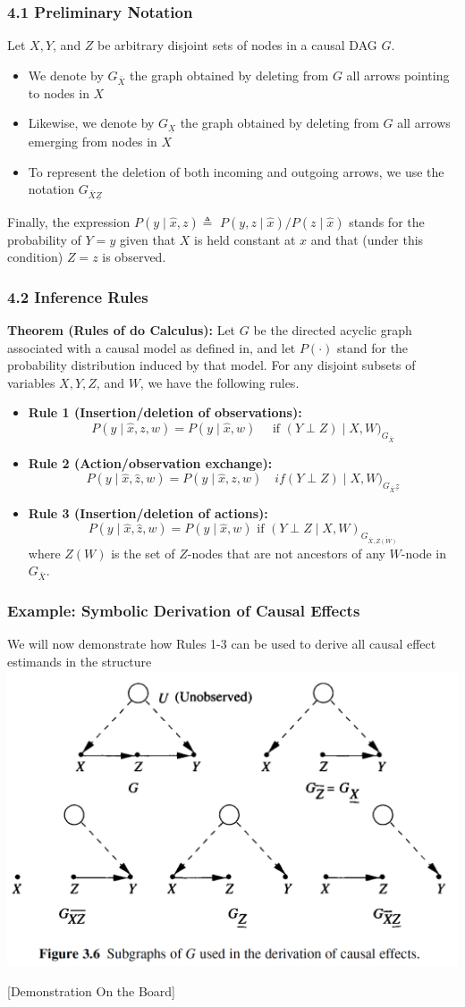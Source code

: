 \documentclass{beamer}
\begin{document}
\begin{frame}
\frametitle{4.1 Preliminary Notation}
Let $X, Y$, and $Z$ be arbitrary disjoint sets of nodes in a causal DAG $G$.
\begin{itemize}
\item We denote by $G_{\bar{X}}$ the graph obtained by deleting from $G$ all arrows pointing to nodes in $X$
\item Likewise, we denote by $G_{\underline{X}}$ the graph obtained by deleting from $G$ all arrows emerging from nodes in $X$
\item To represent the deletion of both incoming and outgoing arrows, we use the notation $G_{\bar{X} \underline{Z}}$
\end{itemize}
Finally, the expression $P(y \mid \hat{x}, z) \triangleq$ $P(y, z \mid \hat{x}) / P(z \mid \hat{x})$ stands for the probability of $Y=y$ given that $X$ is held constant at $x$ and that (under this condition) $Z=z$ is observed.
\end{frame}

\begin{frame}
\frametitle{4.2 Inference Rules}
\textbf{Theorem (Rules of do Calculus):} Let $G$ be the directed acyclic graph associated with a causal model as defined in, and let $P(\cdot)$ stand for the probability distribution induced by that model. For any disjoint subsets of variables $X, Y, Z$, and $W$, we have the following rules.
\begin{itemize}
\item \textbf{Rule 1 (Insertion/deletion of observations):}
$$
P(y \mid \hat{x}, z, w)=P(y \mid \hat{x}, w) \quad \text { if }(Y \perp Z) \mid X, W)_{G_{\bar{X}}}
$$
\item \textbf{Rule 2 (Action/observation exchange):}
$$
P(y \mid \hat{x}, \hat{z}, w)=P(y \mid \hat{x}, z, w) \quad if (Y \perp Z) \mid X, W)_{G_{\bar{X}} \underline{z}}
$$
\item \textbf{Rule 3 (Insertion/deletion of actions):}
$$
P(y \mid \hat{x}, \hat{z}, w)=P(y \mid \hat{x}, w) \text { if }(Y \perp Z \mid X, W)_{G_{\bar{X}, \overline{Z(W)}}}
$$
where $Z(W)$ is the set of $Z$-nodes that are not ancestors of any $W$-node in $G_{\bar{X}}$.
\end{itemize}
\end{frame}

\begin{frame}
\frametitle{Example: Symbolic Derivation of Causal Effects}
We will now demonstrate how Rules 1-3 can be used to derive all causal effect estimands in the structure
\includegraphics[scale=0.45]{img/fig_7}
\begin{center}
[Demonstration On the Board]
\end{center}
\end{frame}
\end{document}
